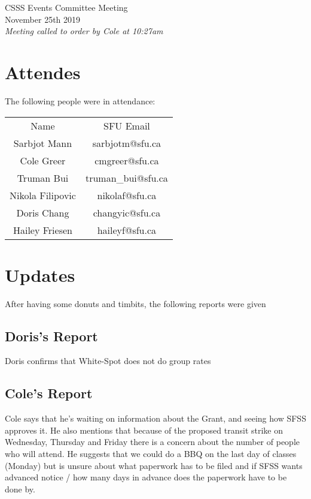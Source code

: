 \documentclass[12pt]{article}
\begin{document}
\begin{center}
CSSS Events Committee Meeting \\
November 25th 2019 \\
\em Meeting called to order by Cole at 10:27am
\end{center}
\tableofcontents
\thispagestyle{empty}
\clearpage
{} 

\newpage 
\section{Attendes} \label{sec:Introduction}
The following people were in attendance: 
\begin{table}[h]
\centering
\begin{tabular}{cc}
Name                   & SFU Email             \\
Sarbjot Mann           & sarbjotm@sfu.ca       \\
Cole Greer             & cmgreer@sfu.ca        \\
Truman Bui             & truman\_bui@sfu.ca          \\
Nikola Filipovic  & nikolaf@sfu.ca  \\
Doris Chang            & changyic@sfu.ca  \\
Hailey Friesen  & haileyf@sfu.ca
\end{tabular}
\end{table}

\section{Updates} \label{sec:Updates}

\noindent After having some donuts and timbits, the following reports were given 

\subsection{Doris's Report}
\noindent Doris confirms that White-Spot does not do group rates

\subsection{Cole's Report}
\noindent Cole says that he's waiting on information about the Grant, and seeing how SFSS approves it. He also mentions that because of the proposed transit strike on Wednesday, Thursday and Friday there is a concern about the number of people who will attend. He suggests that we could do a BBQ on the last day of classes (Monday) but is unsure about what paperwork has to be filed and if SFSS wants advanced notice / how many days in advance does the paperwork have to be done by. 
\end{document}
